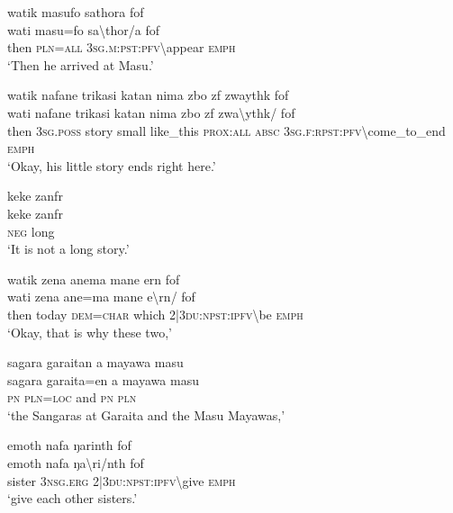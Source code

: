 \ea\label{ex:3:a7610}
watik masufo sathora fof\\
\gll wati	masu=fo	sa{\textbackslash}thor/a	fof\\
     then	\textsc{pln}=\textsc{all}	3\textsc{sg}.\textsc{m}:\textsc{pst}:\textsc{pfv}{\textbackslash}appear	\textsc{emph}\\
\glt `Then he arrived at Masu.'
\z

\ea\label{ex:3:a7611}
watik nafane trikasi katan nima zbo zf zwaythk fof\\
\gll wati	nafane	trikasi	katan	nima	zbo	zf	zwa{\textbackslash}ythk/	fof\\
     then	3\textsc{sg}.\textsc{poss}	story	small	like\_this	\textsc{prox}:\textsc{all}	\textsc{absc}	3\textsc{sg}.\textsc{f}:\textsc{rpst}:\textsc{pfv}{\textbackslash}come\_to\_end	\textsc{emph}\\
\glt `Okay, his little story ends right here.'
\z

\ea\label{ex:3:a7613}
keke zanfr\\
\gll keke	zanfr\\
     \textsc{neg}	long\\
\glt `It is not a long story.'
\z

\ea\label{ex:3:a7614}
watik zena anema mane ern fof\\
\gll wati	zena	ane=ma	mane	e{\textbackslash}rn/	fof\\
     then	today	\textsc{dem}=\textsc{char}	which	2|3\textsc{du}:\textsc{npst}:\textsc{ipfv}{\textbackslash}be	\textsc{emph}\\
\glt `Okay, that is why these two,'
\z

\ea\label{ex:3:a7615}
sagara garaitan a mayawa masu\\
\gll sagara	garaita=en	a	mayawa	masu\\
     \textsc{pn}	\textsc{pln}=\textsc{loc}	and	\textsc{pn}	\textsc{pln}\\
\glt `the Sangaras at Garaita and the Masu Mayawas,'
\z

\ea\label{ex:3:a7617}
emoth nafa ŋarinth fof\\
\gll emoth	nafa	ŋa{\textbackslash}ri/nth	fof\\
     sister	3\textsc{nsg}.\textsc{erg}	2|3\textsc{du}:\textsc{npst}:\textsc{ipfv}{\textbackslash}give	\textsc{emph}\\
\glt `give each other sisters.'
\z


